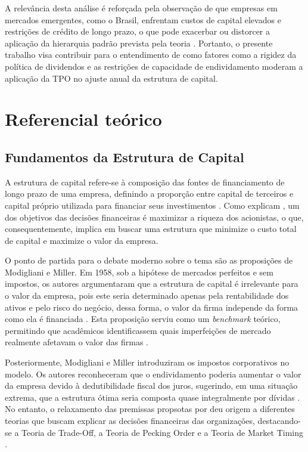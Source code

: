\documentclass[a4paper,12pt]{article}
\begin{document}
A relevância desta análise é reforçada pela observação de que empresas em mercados emergentes, como o Brasil, enfrentam custos de capital elevados e restrições de crédito de longo prazo, o que pode exacerbar ou distorcer a aplicação da hierarquia padrão prevista pela teoria \cite{Souza2024, AssafNeto2014}. Portanto, o presente trabalho visa contribuir para o entendimento de como fatores como a rigidez da política de dividendos e as restrições de capacidade de endividamento moderam a aplicação da TPO no ajuste anual da estrutura de capital.

\newpage

\section{Referencial teórico}

\subsection{Fundamentos da Estrutura de Capital}
A estrutura de capital refere-se à composição das fontes de financiamento de longo prazo de uma empresa, definindo a proporção entre capital de terceiros e capital próprio utilizada para financiar seus investimentos \cite{AssafNeto2014}. Como explicam , um dos objetivos das decisões financeiras é maximizar a riqueza dos acionistas, o que, consequentemente, implica em buscar uma estrutura que minimize o custo total de capital e maximize o valor da empresa.

O ponto de partida para o debate moderno sobre o tema são as proposições de Modigliani e Miller. Em 1958, sob a hipótese de mercados perfeitos e sem impostos, os autores argumentaram que a estrutura de capital é irrelevante para o valor da empresa, pois este seria determinado apenas pela rentabilidade dos ativos e pelo risco do negócio, dessa forma, o valor da firma independe da forma como ela é financiada \cite{modigliani1958}. Esta proposição serviu como um \textit{benchmark} teórico, permitindo que acadêmicos identificassem quais imperfeições de mercado realmente afetavam o valor das firmas \cite{david2007}.

Posteriormente, Modigliani e Miller introduziram os impostos corporativos no modelo. Os autores reconheceram que o endividamento poderia aumentar o valor da empresa devido à dedutibilidade fiscal dos juros, sugerindo, em uma situação extrema, que a estrutura ótima seria composta quase integralmente por dívidas \cite{modigliani1963}. No entanto, o relaxamento das premissas propsotas por  deu origem a diferentes teorias que buscam explicar as decisões financeiras das organizações, destacando-se a Teoria de Trade-Off, a Teoria de Pecking Order e a Teoria de Market Timing \cite{Singh2025, Souza2024}.
\end{document}
